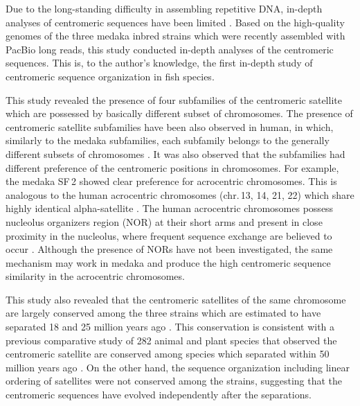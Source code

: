 Due to the long-standing difficulty in assembling repetitive DNA, in-depth analyses of centromeric sequences have been limited \cite{Plohl2014}. Based on the high-quality genomes of the three medaka inbred strains which were recently assembled with PacBio long reads, this study conducted in-depth analyses of the centromeric sequences. This is, to the author's knowledge, the first in-depth study of centromeric sequence organization in fish species.

This study revealed the presence of four subfamilies of the centromeric satellite which are possessed by basically different subset of chromosomes. The presence of centromeric satellite subfamilies have been also observed in human, in which, similarly to the medaka subfamilies, each subfamily belongs to the generally different subsets of chromosomes \cite{Alexandrov2001}. It was also observed that the subfamilies had different preference of the centromeric positions in chromosomes. For example, the medaka SF\,2 showed clear preference for acrocentric chromosomes. This is analogous to the human acrocentric chromosomes (chr.\,13, 14, 21, 22) which share highly identical alpha-satellite \cite{Willard1991}. The human acrocentric chromosomes possess nucleolus organizers region (NOR) at their short arms and present in close proximity in the nucleolus, where frequent sequence exchange are believed to occur \cite{Willard1991}. Although the presence of NORs have not been investigated, the same mechanism may work in medaka and produce the high centromeric sequence similarity in the acrocentric chromosomes.

This study also revealed that the centromeric satellites of the same chromosome are largely conserved among the three strains which are estimated to have separated 18 and 25 million years ago \cite{Setiamarga2009}. This conservation is consistent with a previous comparative study of 282 animal and plant species that observed the centromeric satellite are conserved among species which separated within 50 million years ago \cite{Melters2013}. On the other hand, the sequence organization including linear ordering of satellites were not conserved among the strains, suggesting that the centromeric sequences have evolved independently after the separations.

